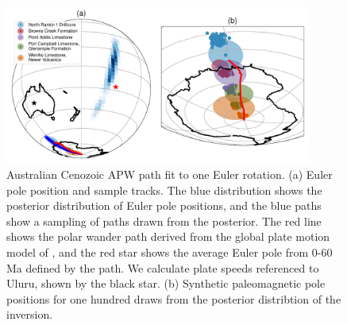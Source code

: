 \documentclass[preprint,12pt,authoryear]{elsarticle}
\begin{document}
\begin{figure}
\includegraphics[width=0.9\textwidth]{figures/australia/australia_paths_1.pdf}
\caption[Australian Cenozoic APW path fit to one Euler rotation.]{Australian Cenozoic APW path fit to one Euler rotation. 
(a) Euler pole position and sample tracks. The blue distribution shows the posterior distribution of Euler pole positions, and the blue paths show a sampling of paths drawn from the posterior. The red line shows the polar wander path derived from the global plate motion model of \citet{seton2012global}, and the red star shows the average Euler pole from 0-60 Ma defined by the \citet{seton2012global} path. We calculate plate speeds referenced to Uluru, shown by the black star.
(b) Synthetic paleomagnetic pole positions for one hundred draws from the posterior distribtion of the inversion.}
\label{fig:australia_paths_1}
\end{figure}
\end{document}
